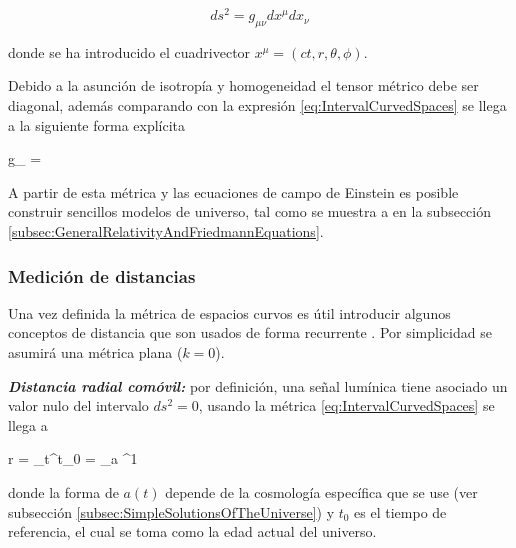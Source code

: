 \[ ds^2 = g_{\mu \nu}dx^\mu dx_\nu \]


donde se ha introducido el cuadrivector $x^\mu = (ct, r, \theta, \phi)$.


Debido a la asunción de isotropía y homogeneidad el tensor métrico debe ser
diagonal, además comparando con la expresión \ref{eq:IntervalCurvedSpaces}
se llega a la siguiente forma explícita


{g_{\mu \nu} = }


A partir de esta métrica y las ecuaciones de campo de Einstein es posible 
construir sencillos modelos de universo, tal como se muestra a en la 
subsección \ref{subsec:GeneralRelativityAndFriedmannEquations}.


			\subsubsection*{Medición de distancias}
			
Una vez definida la métrica de espacios curvos es útil introducir algunos
conceptos de distancia que son usados de forma recurrente \cite{longair2008}. 
Por simplicidad se asumirá una métrica plana ($k = 0$).


\textit{\textbf{Distancia radial comóvil:}} por definición, una señal 
lumínica tiene asociado un valor nulo del intervalo $ds^2 = 0$, usando la 
métrica \ref{eq:IntervalCurvedSpaces} se llega a


{ r = \int_t^{t_0}  = \int_a ^1  }


donde la forma de $a(t)$ depende de la cosmología específica que se use
(ver subsección \ref{subsec:SimpleSolutionsOfTheUniverse}) y $t_0$ es el 
tiempo de referencia, el cual se toma como la edad actual del universo. 


